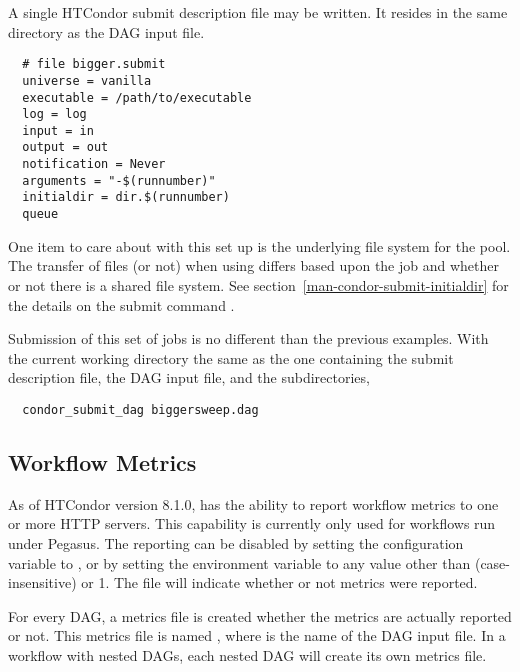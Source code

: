 A single HTCondor submit description file may be written.
It resides in the same directory as the DAG input file.
\begin{verbatim}
  # file bigger.submit
  universe = vanilla
  executable = /path/to/executable
  log = log
  input = in
  output = out
  notification = Never
  arguments = "-$(runnumber)"
  initialdir = dir.$(runnumber)
  queue
\end{verbatim}

One item to care about with this set up is the underlying file system 
for the pool.
The transfer of files (or not) when using 
differs based upon the job  and whether or not there
is a shared file system.
See section~\ref{man-condor-submit-initialdir} for the details on the
submit command .

Submission of this set of jobs is no different than the previous
examples.  
With the current working directory the same as the one containing
the submit description file, the DAG input file, and the subdirectories,
\begin{verbatim}
  condor_submit_dag biggersweep.dag
\end{verbatim}

\subsection{\label{sec:DAGMetrics}Workflow Metrics}

As of HTCondor version 8.1.0,  has the ability to report
workflow metrics to one or more HTTP servers.  
This capability is currently only used for workflows run under Pegasus.  
The reporting can be
disabled by setting the  configuration
variable to ,
or by setting the  environment
variable to any value other than  (case-insensitive) or 1.
The  file will indicate whether or not metrics were
reported.

For every DAG, a metrics file is created whether the metrics
are actually reported or not.
This metrics file is named
,
where  is the name of the DAG input file.
In a workflow
with nested DAGs, each nested DAG will create its own metrics file.

